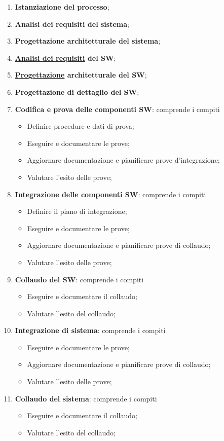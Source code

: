 			\begin{enumerate}
				\item \textbf{Istanziazione del processo};
				\item \textbf{Analisi dei requisiti del sistema};
				\item \textbf{Progettazione architetturale del sistema};
				\item \textbf{\underline{\hyperref[analisideirequisiti]{Analisi dei requisiti}} del SW};
				\item \textbf{\underline{\hyperref[progettazione]{Progettazione}} architetturale del SW};
				\item \textbf{Progettazione di dettaglio del SW};
				\item \textbf{Codifica e prova delle componenti SW}: comprende i compiti
					\begin{itemize}
						\item Definire procedure e dati di prova;
						\item Eseguire e documentare le prove;
						\item Aggiornare documentazione e pianificare prove d’integrazione;
						\item Valutare l’esito delle prove;
					\end{itemize}
				\item \textbf{Integrazione delle componenti SW}: comprende i compiti
					\begin{itemize}
						\item Definire il piano di integrazione;
						\item Eseguire e documentare le prove;
						\item Aggiornare documentazione e pianificare prove di collaudo;
						\item Valutare l’esito delle prove;
					\end{itemize}
				\item \textbf{Collaudo del SW}: comprende i compiti
					\begin{itemize}
						\item Eseguire e documentare il collaudo;
						\item Valutare l’esito del collaudo;
					\end{itemize}	
				\item \textbf{Integrazione di sistema}: comprende i compiti
					\begin{itemize}
						\item Eseguire e documentare le prove;
						\item Aggiornare documentazione e pianificare prove di collaudo;
						\item Valutare l’esito delle prove;
					\end{itemize}
				\item \textbf{Collaudo del sistema}: comprende i compiti
					\begin{itemize}
						\item Eseguire e documentare il collaudo;
						\item Valutare l’esito del collaudo;
					\end{itemize}
			\end{enumerate}
